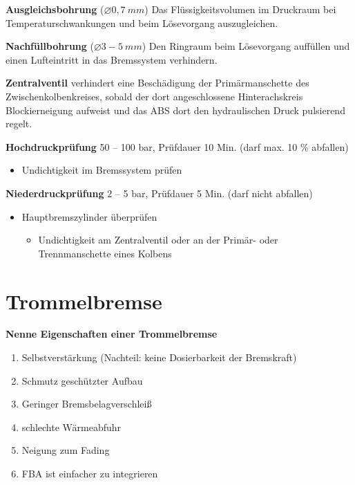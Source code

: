\textbf{Ausgleichsbohrung} ($\varnothing 0,7~mm$) Das
Flüssigkeitsvolumen im Druckraum bei Temperaturschwankungen und beim
Lösevorgang auszugleichen.

\textbf{Nachfüllbohrung} ($\varnothing 3 - 5~mm$) Den Ringraum beim
Lösevorgang auffüllen und einen Lufteintritt in das Bremssystem
verhindern.

\textbf{Zentralventil} verhindert eine Beschädigung der Primärmanschette
des Zwischenkolbenkreises, sobald der dort angeschlossene
Hinterachskreis Blockierneigung aufweist und das ABS dort den
hydraulischen Druck pulsierend regelt.

\textbf{Hochdruckprüfung} 50 -- 100 bar, Prüfdauer 10 Min. (darf max. 10
\% abfallen)

\begin{itemize}
\item
  Undichtigkeit im Bremssystem prüfen
\end{itemize}

\textbf{Niederdruckprüfung} 2 -- 5 bar, Prüfdauer 5 Min. (darf nicht
abfallen)

\begin{itemize}
\item
  Hauptbremszylinder überprüfen

  \begin{itemize}
  \item
    Undichtigkeit am Zentralventil oder an der Primär- oder
    Trennmanschette eines Kolbens
  \end{itemize}
\end{itemize}

\newpage

\section{Trommelbremse}\label{trommelbremse}

\textbf{Nenne Eigenschaften einer Trommelbremse}

\begin{enumerate}
\item
  Selbstverstärkung (Nachteil: keine Dosierbarkeit der Bremskraft)
\item
  Schmutz geschützter Aufbau
\item
  Geringer Bremsbelagverschleiß
\item
  schlechte Wärmeabfuhr
\item
  Neigung zum Fading
\item
  FBA ist einfacher zu integrieren
\end{enumerate}

